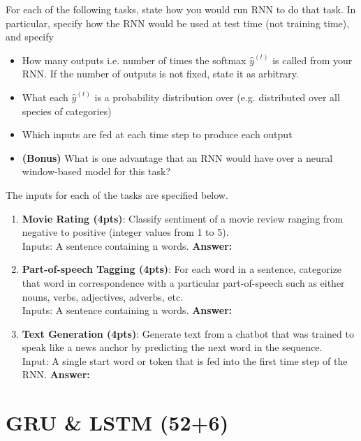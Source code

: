 \documentclass{assignment format}
\newenvironment{answer}{
    {\bf Answer:} \begingroup\color{red}
}{\endgroup}%
\begin{document}
For each of the following tasks, state how you would run RNN to do that task. In particular, specify how the RNN would be used at test time (not training time), and specify
\begin{itemize}
    \item How many outputs i.e. number of times the softmax $\hat{y}^{(t)}$ is called from your RNN. If the number of outputs is not fixed, state it as arbitrary.  
    \item What each $\hat{y}^{(t)}$ is a probability distribution over (e.g. distributed over all species of categories)
    \item Which inputs are fed at each time step to produce each output
    \item \textbf{(Bonus) }What is one advantage that an RNN would have over a neural window-based model for this task?
    \end{itemize}
The inputs for each of the tasks are specified below.
\begin{enumerate}[label=(\alph*)]
    \item \textbf{Movie Rating (4pts)}: Classify sentiment of a movie review ranging from negative to positive (integer values from 1 to 5).\\Inputs: A sentence
    containing n words.
    \begin{answer}
    \end{answer}
    \item \textbf{Part-of-speech Tagging (4pts)}: For each word in a sentence, categorize that word in correspondence with a particular part-of-speech such as either nouns, verbs, adjectives, adverbs, etc.\\Inputs: A sentence containing n words.
    \begin{answer}
    \end{answer}
    \item \textbf{Text Generation (4pts)}: Generate text from a chatbot that was trained to speak like a news anchor by predicting the next word in the sequence. \\Input: A single start word or token that is fed into the first time step of the RNN.
    \begin{answer}
    \end{answer}
    \end{enumerate}
    

    
    

\section{GRU \& LSTM (52+6)}
\end{document}
